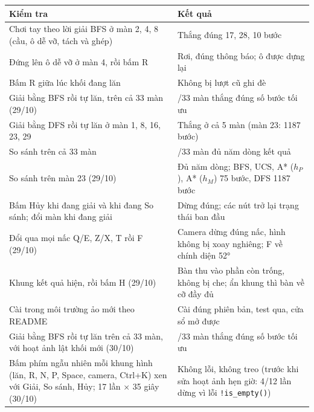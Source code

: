 {\def\LTcaptype{none} %
\begin{longtable}[]{@{}
  >{\raggedright\arraybackslash}p{}
  >{\raggedright\arraybackslash}p{}@{}}
\toprule\noalign{}
\rowcolor{tablehead}\begin{minipage}[b]{\linewidth}\raggedright
\textbf{Kiểm tra}
\end{minipage} & \begin{minipage}[b]{\linewidth}\raggedright
\textbf{Kết quả}
\end{minipage} \\
\midrule\noalign{}
\endhead
\bottomrule\noalign{}
\endlastfoot
Chơi tay theo lời giải BFS ở màn 2, 4, 8 (cầu, ô dễ vỡ, tách và ghép) & Thắng đúng 17, 28, 10 bước \\
\rowrule
Đứng lên ô dễ vỡ ở màn 4, rồi bấm R & Rơi, đúng thông báo; ô được dựng lại \\
\rowrule
Bấm R giữa lúc khối đang lăn & Không bị lượt cũ ghi đè \\
\rowrule
Giải bằng BFS rồi tự lăn, trên cả 33 màn (29/10) & 33/33 màn thắng đúng số bước tối ưu \\
\rowrule
Giải bằng DFS rồi tự lăn ở màn 1, 8, 16, 23, 29 & Thắng ở cả 5 màn (màn 23: 1187 bước) \\
\rowrule
So sánh trên cả 33 màn & 33/33 màn đủ năm dòng kết quả \\
\rowrule
So sánh trên màn 23 (29/10) & Đủ năm dòng; BFS, UCS, A* (\(h_P\)), A* (\(h_M\)) 75 bước, DFS 1187 bước \\
\rowrule
Bấm Hủy khi đang giải và khi đang So sánh; đổi màn khi đang giải & Dừng đúng; các nút trở lại trạng thái ban đầu \\
\rowrule
Đổi qua mọi nấc Q/E, Z/X, T rồi F (29/10) & Camera dừng đúng nấc, hình không bị xoay nghiêng; F về chính diện 52° \\
\rowrule
Khung kết quả hiện, rồi bấm H (29/10) & Bàn thu vào phần còn trống, không bị che; ẩn khung thì bàn về cỡ đầy đủ \\
\rowrule
Cài trong môi trường ảo mới theo README & Cài đúng phiên bản, test qua, cửa sổ mở được \\
\rowrule
Giải bằng BFS rồi tự lăn trên cả 33 màn, với hoạt ảnh lật khối mới (30/10) & 33/33 màn thắng đúng số bước tối ưu \\
\rowrule
Bấm phím ngẫu nhiên mỗi khung hình (lăn, R, N, P, Space, camera, Ctrl+K) xen với Giải, So sánh, Hủy; 17 lần × 35 giây (30/10) & Không lỗi, không treo (trước khi sửa hoạt ảnh hẹn giờ: 4/12 lần dừng vì lỗi \texttt{!is\_\allowbreak{}empty()}) \\

\end{longtable}}
